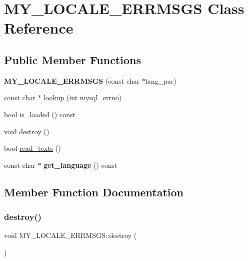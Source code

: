 \hypertarget{classMY__LOCALE__ERRMSGS}{}\section{M\+Y\+\_\+\+L\+O\+C\+A\+L\+E\+\_\+\+E\+R\+R\+M\+S\+GS Class Reference}
\label{classMY__LOCALE__ERRMSGS}
\subsection*{Public Member Functions}
\begin{DoxyCompactItemize}
\item 
\mbox{\label{classMY__LOCALE__ERRMSGS_aa325530fbd654d206c7a39553eba0cf4}} 
{\bfseries M\+Y\+\_\+\+L\+O\+C\+A\+L\+E\+\_\+\+E\+R\+R\+M\+S\+GS} (const char $\ast$lang\+\_\+par)
\item 
const char $\ast$ \mbox{\hyperlink{classMY__LOCALE__ERRMSGS_a5b285fee4903311c7284d5fdf0bd7cad}{lookup}} (int mysql\+\_\+errno)
\item 
bool \mbox{\hyperlink{classMY__LOCALE__ERRMSGS_a9ecc18e8f3a6a458f8f55ce1ba2824a4}{is\+\_\+loaded}} () const
\item 
void \mbox{\hyperlink{classMY__LOCALE__ERRMSGS_ab5a48f78914d6ea18049758eadc7c66c}{destroy}} ()
\item 
bool \mbox{\hyperlink{classMY__LOCALE__ERRMSGS_aeabbcfe72a53fc6af113879b5ed8a130}{read\+\_\+texts}} ()
\item 
\mbox{\label{classMY__LOCALE__ERRMSGS_a44ebbd2249ca49f4eb26d2deb8248854}} 
const char $\ast$ {\bfseries get\+\_\+language} () const
\end{DoxyCompactItemize}


\subsection{Member Function Documentation}
\mbox{\label{classMY__LOCALE__ERRMSGS_ab5a48f78914d6ea18049758eadc7c66c}} 
\subsubsection{\texorpdfstring{destroy()}{destroy()}}
{\footnotesize\ttfamily void M\+Y\+\_\+\+L\+O\+C\+A\+L\+E\+\_\+\+E\+R\+R\+M\+S\+G\+S\+::destroy (\begin{DoxyParamCaption}{ }\end{DoxyParamCaption})}

